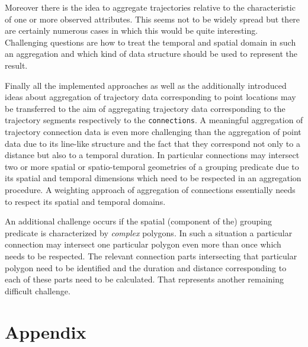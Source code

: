 \documentclass[12pt, oneside, a4paper]{scrbook}
\let\code=\texttt
\begin{document}
Moreover there is the idea to aggregate trajectories relative to the characteristic of one or more observed attributes. 
This seems not to be widely spread but there are certainly numerous cases in which this would be quite interesting.
Challenging questions are how to treat the temporal and spatial domain in such an aggregation and which kind of data structure should be used to represent the result.
\par\medskip

Finally all the implemented approaches as well as the additionally introduced ideas about aggregation of trajectory data corresponding to point locations may be transferred to the aim of aggregating trajectory data corresponding to the trajectory segments respectively to the \code{connections}. 
A meaningful aggregation of trajectory connection data is even more challenging than the aggregation of point data due to its line-like structure and the fact that they correspond not only to a distance but also to a temporal duration.
In particular connections may intersect two or more spatial or spatio-temporal geometries of a grouping predicate due to its spatial and temporal dimensions which need to be respected in an aggregation procedure.
A weighting approach of aggregation of connections essentially needs to respect its spatial and temporal domains.
\par\medskip

An additional challenge occurs if the spatial (component of the) grouping predicate is characterized by \textit{complex} polygons.
In such a situation a particular connection may intersect one particular polygon even more than once which needs to be respected.
The relevant connection parts intersecting that particular polygon need to be identified and the duration and distance corresponding to each of these parts need to be calculated.
That represents another remaining difficult challenge.
\clearpage








\appendix

\chapter{Appendix}

\end{document}
